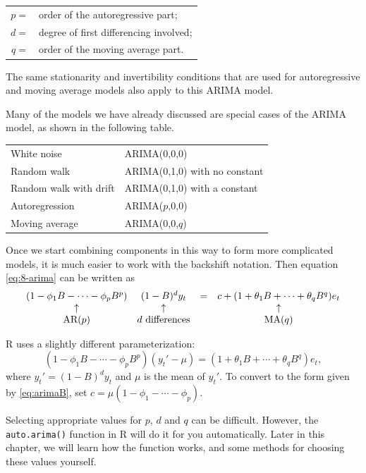 \documentclass[]{book}
\begin{document}
\begin{longtable}[]{@{}rl@{}}
\toprule
\endhead
\(p =\) & order of the autoregressive part;\tabularnewline
\(d =\) & degree of first differencing involved;\tabularnewline
\(q =\) & order of the moving average part.\tabularnewline
\bottomrule
\end{longtable}

The same stationarity and invertibility conditions that are used for autoregressive and moving average models also apply to this ARIMA model.

Many of the models we have already discussed are special cases of the ARIMA model, as shown in the following table.

\begin{longtable}[]{@{}ll@{}}
\toprule
\endhead
White noise & ARIMA(0,0,0)\tabularnewline
Random walk & ARIMA(0,1,0) with no constant\tabularnewline
Random walk with drift & ARIMA(0,1,0) with a constant\tabularnewline
Autoregression & ARIMA(\(p\),0,0)\tabularnewline
Moving average & ARIMA(0,0,\(q\))\tabularnewline
\bottomrule
\end{longtable}

Once we start combining components in this way to form more complicated models, it is much easier to work with the backshift notation. Then equation \eqref{eq:8-arima} can be written as
\begin{equation}
\label{eq:arimaB}
  \begin{array}{c c c c}
    (1-\phi_1B - \cdots - \phi_p B^p) & (1-B)^d y_{t} &= &c + (1 + \theta_1 B + \cdots + \theta_q B^q)e_t\\
    {\uparrow} & {\uparrow} & &{\uparrow}\\
    \text{AR($p$)} & \text{$d$ differences} & & \text{MA($q$)}\\
  \end{array}
\end{equation}

R uses a slightly different parameterization:
\begin{equation}
\label{eq:R-arima}
  (1-\phi_1B - \cdots - \phi_p B^p)(y_t' - \mu) = (1 + \theta_1 B + \cdots + \theta_q B^q)e_t,
\end{equation}
where \(y_t' = (1-B)^d y_t\) and \(\mu\) is the mean of \(y_t'\). To convert to the form given by \eqref{eq:arimaB}, set \(c = \mu(1-\phi_1 - \cdots - \phi_p )\).

Selecting appropriate values for \(p\), \(d\) and \(q\) can be difficult. However, the \texttt{auto.arima()} function in R will do it for you automatically. Later in this chapter, we will learn how the function works, and some methods for choosing these values yourself.
\end{document}
